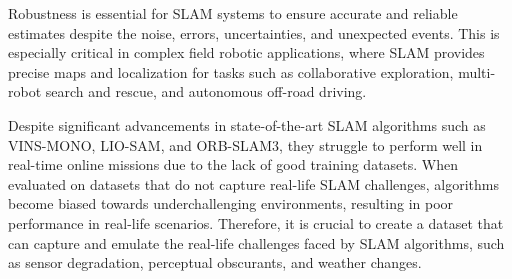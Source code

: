 \documentclass[10pt,twocolumn,letterpaper]{article}
\begin{document}
Robustness is essential for SLAM systems to ensure accurate and reliable estimates despite the noise, errors, uncertainties, and unexpected events. This is especially critical in complex field robotic applications, where SLAM provides precise maps and localization for tasks such as collaborative exploration, multi-robot search and rescue, and autonomous off-road driving.


Despite significant advancements in state-of-the-art SLAM algorithms such as VINS-MONO, LIO-SAM, and ORB-SLAM3\cite{vins-mono, liosam2020shan, orb-slam3}, they struggle to perform well in real-time online missions due to the lack of good training datasets. When evaluated on datasets that do not capture real-life SLAM challenges, algorithms become biased towards underchallenging environments, resulting in poor performance in real-life scenarios. Therefore, it is crucial to create a dataset that can capture and emulate the real-life challenges faced by SLAM algorithms, such as sensor degradation, perceptual obscurants, and weather changes.


\end{document}
